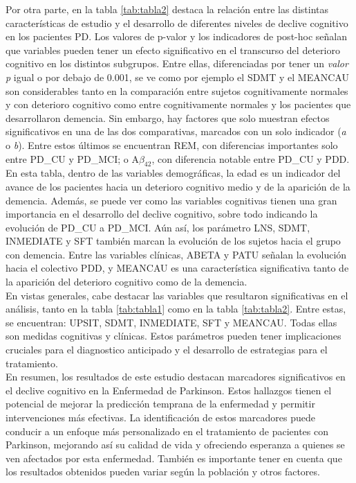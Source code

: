 \documentclass[12pt]{article}
\begin{document}
Por otra parte, en la tabla \ref{tab:tabla2} destaca la relación entre las distintas características de estudio y el desarrollo de diferentes niveles de declive cognitivo en los pacientes PD. Los valores de p-valor y los indicadores de post-hoc señalan que variables pueden tener un efecto significativo en el transcurso del deterioro cognitivo en los distintos subgrupos. Entre ellas, diferenciadas por tener un \textit{valor p} igual o por debajo de 0.001, se ve como por ejemplo el SDMT y el MEANCAU son considerables tanto en la comparación entre sujetos cognitivamente normales y con deterioro cognitivo como entre cognitivamente normales y los pacientes que desarrollaron demencia. Sin embargo, hay factores que solo muestran efectos significativos en una de las dos comparativas, marcados con un solo indicador (\textit{a} o \textit{b}). Entre estos últimos se encuentran REM, con diferencias importantes solo entre PD\_CU y PD\_MCI; o A$\beta_{42}$, con diferencia notable entre PD\_CU y PDD. En esta tabla, dentro de las variables demográficas, la edad es un indicador del avance de los pacientes hacia un deterioro cognitivo medio y de la aparición de la demencia. Además, se puede ver como las variables cognitivas tienen una gran importancia en el desarrollo del declive cognitivo, sobre todo indicando la evolución de PD\_CU a PD\_MCI. Aún así, los parámetro LNS, SDMT, INMEDIATE y SFT también marcan la evolución de los sujetos hacia el grupo con demencia. Entre las variables clínicas, ABETA y PATU señalan la evolución hacia el colectivo PDD, y MEANCAU es una característica significativa tanto de la aparición del deterioro cognitivo como de la demencia. \\

En vistas generales, cabe destacar las variables que resultaron significativas en el análisis, tanto en la tabla \ref{tab:tabla1} como en la tabla \ref{tab:tabla2}. Entre estas, se encuentran: UPSIT, SDMT, INMEDIATE, SFT y MEANCAU. Todas ellas son medidas cognitivas y clínicas. Estos parámetros pueden tener implicaciones cruciales para el diagnostico anticipado y el desarrollo de estrategias para el tratamiento.\\

En resumen, los resultados de este estudio destacan marcadores significativos en el declive cognitivo en la Enfermedad de Parkinson. Estos hallazgos tienen el potencial de mejorar la predicción temprana de la enfermedad y permitir intervenciones más efectivas. La identificación de estos marcadores puede conducir a un enfoque más personalizado en el tratamiento de pacientes con Parkinson, mejorando así su calidad de vida y ofreciendo esperanza a quienes se ven afectados por esta enfermedad. También es importante tener en cuenta que los resultados obtenidos pueden variar según la población y otros factores.
\end{document}
